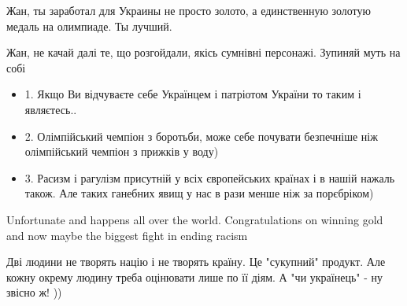\begin{itemize}
Жан, ты заработал для Украины не просто золото, а единственную золотую медаль
на олимпиаде. Ты лучший.

 

Жан, не качай далі те, що розгойдали, якісь сумнівні персонажі. Зупиняй муть на собі


 

\begin{itemize}
\item 1. Якщо Ви відчуваєте себе Українцем і патріотом України то таким і являєтесь..
\item 2. Олімпійський чемпіон з боротьби, може себе почувати безпечніше ніж олімпійський чемпіон з прижків у воду)
\item 3. Расизм і рагулізм присутній у всіх європейських країнах і в нашій нажаль
також. Але таких ганебних явищ у нас в рази менше ніж за порєбріком)
\end{itemize}


 
Unfortunate and happens all over the world. Congratulations on winning gold and
now maybe the biggest fight in ending racism


 

Дві людини не творять націю і не творять країну. Це "сукупний" продукт. Але
кожну окрему людину треба оцінювати лише по її діям.  А "чи українець" - ну
звісно ж! ))

 


\end{itemize}
